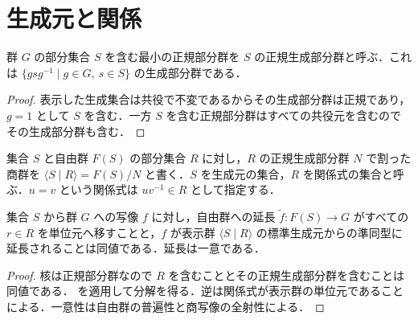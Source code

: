 \section{生成元と関係}
\begin{prop}[正規生成部分群]
群 $G$ の部分集合 $S$ を含む最小の正規部分群を $S$ の正規生成部分群と呼ぶ．これは $\{gsg^{-1}\mid g\in G,\ s\in S\}$ の生成部分群である．
\end{prop}
\begin{proof}
表示した生成集合は共役で不変であるからその生成部分群は正規であり，$g=1$ として $S$ を含む．一方 $S$ を含む正規部分群はすべての共役元を含むのでその生成部分群も含む．
\end{proof}
\begin{defn}[群の表示]
集合 $S$ と自由群 $F(S)$ の部分集合 $R$ に対し，$R$ の正規生成部分群 $N$ で割った商群を $\langle S\mid R\rangle=F(S)/N$ と書く．$S$ を生成元の集合，$R$ を関係式の集合と呼ぶ．$u=v$ という関係式は $uv^{-1}\in R$ として指定する．
\end{defn}
\begin{prop}[表示群の普遍性]
集合 $S$ から群 $G$ への写像 $f$ に対し，自由群への延長 $\widetilde f:F(S)\to G$ がすべての $r\in R$ を単位元へ移すことと，$f$ が表示群 $\langle S\mid R\rangle$ の標準生成元からの準同型に延長されることは同値である．延長は一意である．
\end{prop}
\begin{proof}
核は正規部分群なので $R$ を含むこととその正規生成部分群を含むことは同値である． を適用して分解を得る．逆は関係式が表示群の単位元であることによる．一意性は自由群の普遍性と商写像の全射性による．
\end{proof}
